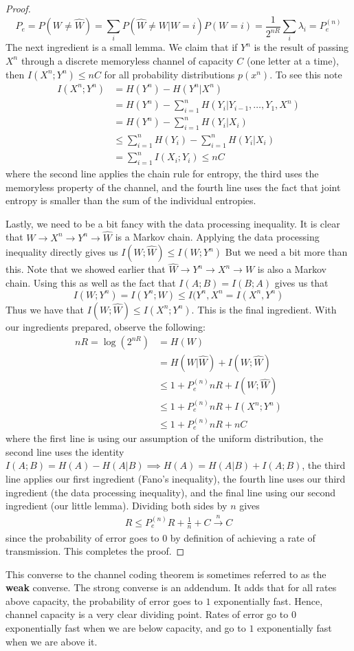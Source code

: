 \begin{proof}
 \[ P_e = P(W \neq \hat{W}) = \sum_i P(\hat{W} \neq W|W=i)P(W=i) = \frac{1}{2^{nR}}\sum_i \lambda_i = P_e^{(n)} \]
 The next ingredient is a small lemma. We claim that if $Y^n$ is the result of passing $X^n$ through a discrete memoryless channel of capacity $C$ (one letter at a time), then $I(X^n;Y^n) \leq nC$ for all probability distributions $p(x^n)$. To see this note
 \begin{align}
 	I(X^n;Y^n) &= H(Y^n)-H(Y^n|X^n) \\ &= H(Y^n)-\sum_{i=1}^n H(Y_i|Y_{i-1},\ldots,Y_1,X^n) \\ &= H(Y^n) - \sum_{i=1}^n H(Y_i|X_i) \\
 	&\leq \sum_{i=1}^n H(Y_i)-\sum_{i=1}^n H(Y_i|X_i) \\
 	&= \sum_{i=1}^n I(X_i;Y_i) \leq nC
 \end{align}
 where the second line applies the chain rule for entropy, the third uses the memoryless property of the channel, and the fourth line uses the fact that joint entropy is smaller than the sum of the individual entropies. \par 
 Lastly, we need to be a bit fancy with the data processing inequality. It is clear that $W \to X^n \to Y^n \to \hat{W}$ is a Markov chain. Applying the data processing inequality directly gives us $I(W;\hat{W})\leq I(W;Y^n)$ But we need a bit more than this. Note that we showed earlier that $\hat{W} \to Y^n \to X^n \to W$ is also a Markov chain. Using this as well as the fact that $I(A;B) = I(B;A)$ gives us that \[ I(W;Y^n) = I(Y^n;W) \leq I(Y^n,X^n = I(X^n,Y^n) \]
 Thus we have that $I(W;\hat{W}) \leq I(X^n;Y^n)$. This is the final ingredient. With our ingredients prepared, observe the following:
 \begin{align}
 	nR = \log(2^{nR}) &= H(W) \\
 			&= H(W|\hat{W})+I(W;\hat{W}) \\
 			&\leq 1+P_e^{(n)}nR+I(W;\hat{W}) \\
 			&\leq 1+P_e^{(n)}nR + I(X^n;Y^n) \\
 			&\leq 1+P_e^{(n)}nR + nC
 \end{align}
 where the first line is using our assumption of the uniform distribution, the second line uses the identity $I(A;B) = H(A)-H(A|B) \implies H(A) = H(A|B)+I(A;B)$, the third line applies our first ingredient (Fano's inequality), the fourth line uses our third ingredient (the data processing inequality), and the final line using our second ingredient (our little lemma). Dividing both sides by $n$ gives 
 \begin{align}
 	R \leq P_e^{(n)}R + \frac{1}{n} + C \overset{n}{\to} C
 \end{align}
 since the probability of error goes to $0$ by definition of achieving a rate of transmission. This completes the proof.
\end{proof}
This converse to the channel coding theorem is sometimes referred to as the \textbf{weak} converse. The strong converse is an addendum. It adds that for all rates above capacity, the probability of error goes to $1$ exponentially fast. Hence, channel capacity is a very clear dividing point. Rates of error go to $0$ exponentially fast when we are below capacity, and go to $1$ exponentially fast when we are above it. 

